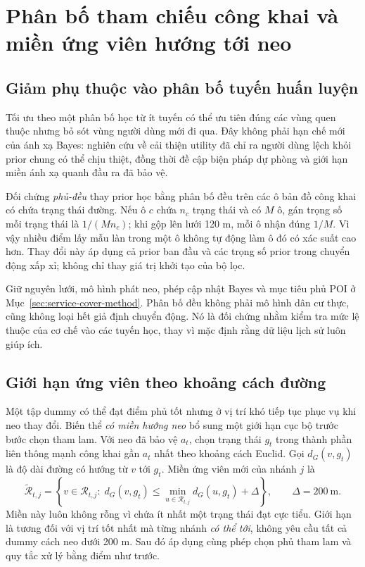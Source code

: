 \begingroup
{}
\section{Phân bố tham chiếu công khai và miền ứng viên hướng tới neo}
\label{sec:recovery-method}

\subsection{Giảm phụ thuộc vào phân bố tuyến huấn luyện}

Tối ưu theo một phân bố học từ ít tuyến có thể ưu tiên đúng các vùng quen thuộc nhưng bỏ sót vùng người dùng mới đi qua. Đây không phải hạn chế mới của ánh xạ Bayes: nghiên cứu về cải thiện utility đã chỉ ra người dùng lệch khỏi prior chung có thể chịu thiệt, đồng thời đề cập biện pháp dự phòng và giới hạn miền ánh xạ quanh đầu ra đã bảo vệ.~\citep{chatzikokolakis2017utility}

Đối chứng \emph{phủ-đều} thay prior học bằng phân bố đều trên các ô bản đồ công khai có chứa trạng thái đường. Nếu ô $c$ chứa $n_c$ trạng thái và có $M$ ô, gán trọng số mỗi trạng thái là $1/(Mn_c)$; khi gộp lên lưới 120 m, mỗi ô nhận đúng $1/M$. Vì vậy nhiều điểm lấy mẫu làn trong một ô không tự động làm ô đó có xác suất cao hơn. Thay đổi này áp dụng cả prior ban đầu và các trọng số prior trong chuyển động xấp xỉ; không chỉ thay giá trị khởi tạo của bộ lọc.

Giữ nguyên lưới, mô hình phát neo, phép cập nhật Bayes và mục tiêu phủ POI ở Mục~\ref{sec:service-cover-method}. Phân bố đều không phải mô hình dân cư thực, cũng không loại hết giả định chuyển động. Nó là đối chứng nhằm kiểm tra mức lệ thuộc của cơ chế vào các tuyến học, thay vì mặc định rằng dữ liệu lịch sử luôn giúp ích.

\subsection{Giới hạn ứng viên theo khoảng cách đường}

Một tập dummy có thể đạt điểm phủ tốt nhưng ở vị trí khó tiếp tục phục vụ khi neo thay đổi. Biến thể \emph{có miền hướng neo} bổ sung một giới hạn cục bộ trước bước chọn tham lam. Với neo đã bảo vệ $a_t$, chọn trạng thái $g_t$ trong thành phần liên thông mạnh công khai gần $a_t$ nhất theo khoảng cách Euclid. Gọi $d_G(v,g_t)$ là độ dài đường có hướng từ $v$ tới $g_t$. Miền ứng viên mới của nhánh $j$ là
\[
\widetilde{\mathcal R}_{t,j}=\left\{v\in\mathcal R_{t,j}:\;
d_G(v,g_t)\leq\min_{u\in\mathcal R_{t,j}}d_G(u,g_t)+\Delta\right\},
\qquad \Delta=200\ \mathrm m.
\]
Miền này luôn không rỗng vì chứa ít nhất một trạng thái đạt cực tiểu. Giới hạn là tương đối với vị trí tốt nhất mà từng nhánh \emph{có thể tới}, không yêu cầu tất cả dummy cách neo dưới 200 m. Sau đó áp dụng cùng phép chọn phủ tham lam và quy tắc xử lý bằng điểm như trước.

